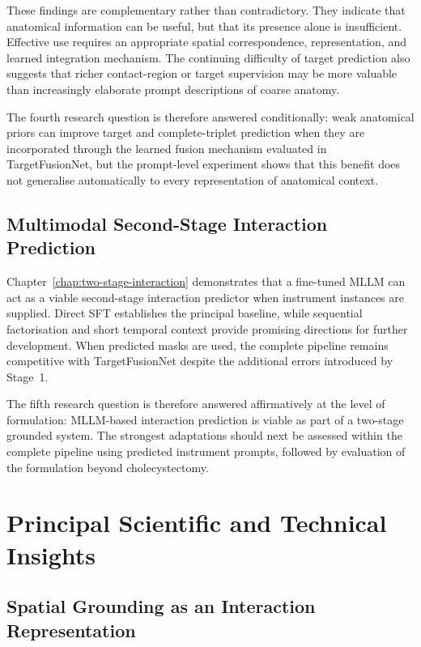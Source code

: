 These findings are complementary rather than contradictory. They indicate that anatomical information can be useful, but that its presence alone is insufficient. Effective use requires an appropriate spatial correspondence, representation, and learned integration mechanism. The continuing difficulty of target prediction also suggests that richer contact-region or target supervision may be more valuable than increasingly elaborate prompt descriptions of coarse anatomy.

The fourth research question is therefore answered conditionally: weak anatomical priors can improve target and complete-triplet prediction when they are incorporated through the learned fusion mechanism evaluated in TargetFusionNet, but the prompt-level experiment shows that this benefit does not generalise automatically to every representation of anatomical context.

\subsection{Multimodal Second-Stage Interaction Prediction}
\label{sec:discussion-rq5}

Chapter~\ref{chap:two-stage-interaction} demonstrates that a fine-tuned MLLM can act as a viable second-stage interaction predictor when instrument instances are supplied. Direct SFT establishes the principal baseline, while sequential factorisation and short temporal context provide promising directions for further development. When predicted masks are used, the complete pipeline remains competitive with TargetFusionNet despite the additional errors introduced by Stage~1.

The fifth research question is therefore answered affirmatively at the level of formulation: MLLM-based interaction prediction is viable as part of a two-stage grounded system. The strongest adaptations should next be assessed within the complete pipeline using predicted instrument prompts, followed by evaluation of the formulation beyond cholecystectomy.

\section{Principal Scientific and Technical Insights}
\label{sec:discussion-implications}

\subsection{Spatial Grounding as an Interaction Representation}
\label{sec:discussion-grounding-insight}

